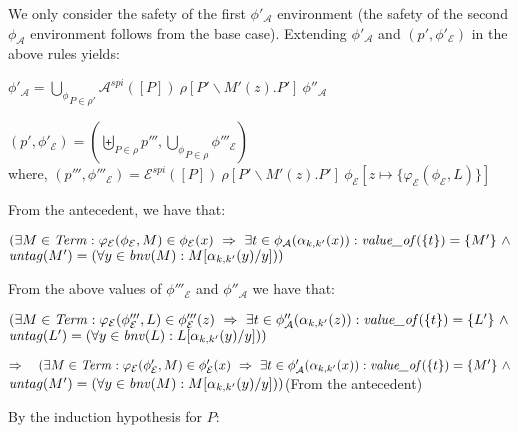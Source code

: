 \documentclass[10pt,a4paper,final,oneside,fleqn]{book}
\begin{document}
\noindent
We only consider the safety of the first $\phi'_\mathcal{A}$ environment (the safety of the second $\phi_\mathcal{A}$ environment follows from the base case). Extending $\phi'_\mathcal{A}$ and $(p',\phi'_\mathcal{E})$ in the above rules yields:

\noindent
$\phi'_\mathcal{A}=\underset{P\in\rho'}{\bigcup_\phi}\mathcal{A}^{spi}(\![P]\!)~\rho[P'\backslash M'(z).P']~\phi''_\mathcal{A}$

\noindent
$(p',\phi'_\mathcal{E})=(\underset{P\in\rho}{\biguplus}p''',\underset{P\in\rho}{\bigcup_\phi}\phi'''_\mathcal{E})$\\
where, $(p''',\phi'''_\mathcal{E})=\mathcal{E}^{spi}(\![P]\!)~\rho[P'\backslash M'(z).P']~\phi_\mathcal{E}[z\mapsto\{\varphi_\mathcal{E}(\phi_\mathcal{E},L)\}]$\vspace{5mm}

\noindent
From the antecedent, we have that:

\noindent
$(\exists M\in\mbox{{\itshape Term\/}}:\varphi_\mathcal{E}(\phi_\mathcal{E},M)\in\phi_\mathcal{E}(x)~\Rightarrow~\exists t\in\phi_\mathcal{A}(\alpha_{k,k'}(x)):\mbox{{\itshape value\_of\/}}(\{t\})=\{M'\}~\wedge$\\
$\mbox{{\itshape untag\/}}(M')=(\forall y\in\mbox{{\itshape bnv\/}}(M):M[\alpha_{k,k'}(y)/y]))$\vspace{5mm}

\noindent
From the above values of $\phi'''_\mathcal{E}$ and $\phi''_\mathcal{A}$ we have that:

\noindent

$(\exists M\in\mbox{{\itshape Term\/}}:\varphi_\mathcal{E}(\phi'''_\mathcal{E},L)\in\phi'''_\mathcal{E}(z)~\Rightarrow~\exists t\in\phi''_\mathcal{A}(\alpha_{k,k'}(z)):\mbox{{\itshape value\_of\/}}(\{t\})=\{L'\}~\wedge$\\
$\mbox{{\itshape untag\/}}(L')=(\forall y\in\mbox{{\itshape bnv\/}}(L):L[\alpha_{k,k'}(y)/y]))$\vspace{5mm}

\noindent
$\Rightarrow~~~(\exists M\in\mbox{{\itshape Term\/}}:\varphi_\mathcal{E}(\phi'_\mathcal{E},M)\in\phi'_\mathcal{E}(x)~\Rightarrow~\exists t\in\phi'_\mathcal{A}(\alpha_{k,k'}(x)):\mbox{{\itshape value\_of\/}}(\{t\})=\{M'\}~\wedge$\\
$\mbox{{\itshape untag\/}}(M')=(\forall y\in\mbox{{\itshape bnv\/}}(M):M[\alpha_{k,k'}(y)/y]))\hfill$(From the antecedent)\vspace{5mm}

\noindent
By the induction hypothesis for $P$:
\end{document}
